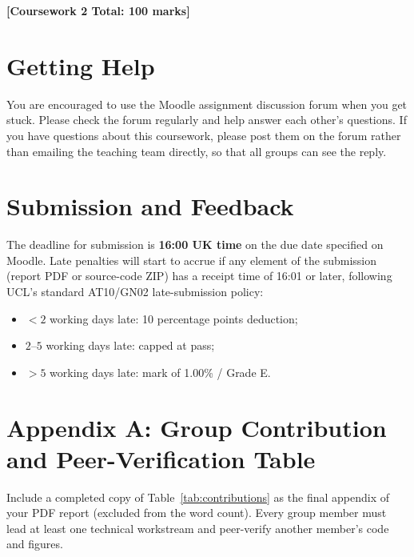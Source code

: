 \documentclass[11pt,a4paper]{article}
\begin{document}
\bigskip
\begin{center}
    \textbf{[Coursework 2 Total: 100 marks]}
\end{center}

\section*{Getting Help}
You are encouraged to use the Moodle assignment discussion forum when you get stuck. Please check the forum regularly and help answer each other's questions. If you have questions about this coursework, please post them on the forum rather than emailing the teaching team directly, so that all groups can see the reply.

\section*{Submission and Feedback}
The deadline for submission is \textbf{16:00 UK time} on the due date specified on Moodle. Late penalties will start to accrue if any element of the submission (report PDF or source-code ZIP) has a receipt time of 16:01 or later, following UCL's standard AT10/GN02 late-submission policy:
\begin{itemize}[leftmargin=1.5em, itemsep=0.15em]
    \item $< 2$ working days late: 10 percentage points deduction;
    \item $2$--$5$ working days late: capped at pass;
    \item $> 5$ working days late: mark of 1.00\% / Grade E.
\end{itemize}

\newpage
\thispagestyle{endpage}

\section*{Appendix A: Group Contribution and Peer-Verification Table}
Include a completed copy of Table~\ref{tab:contributions} as the final appendix of your PDF report (excluded from the word count). Every group member must lead at least one technical workstream and peer-verify another member's code and figures.
\end{document}
